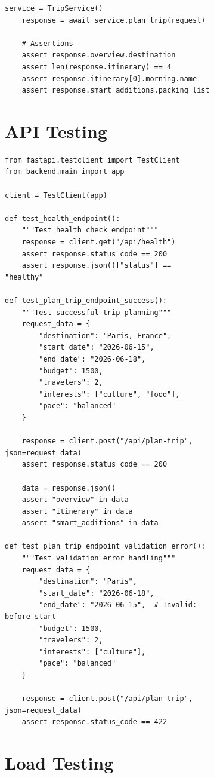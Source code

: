 \documentclass[12pt,a4paper]{report}
\begin{document}
\begin{figure}[H]
\begin{plantuml}
\begin{figure}[H]
\begin{plantuml}
\begin{lstlisting}[style=pythonstyle, caption={Integration Test Examples}]
    service = TripService()
    response = await service.plan_trip(request)
    
    # Assertions
    assert response.overview.destination
    assert len(response.itinerary) == 4
    assert response.itinerary[0].morning.name
    assert response.smart_additions.packing_list
\end{lstlisting}

\section{API Testing}

\begin{lstlisting}[style=pythonstyle, caption={API Endpoint Tests}]
from fastapi.testclient import TestClient
from backend.main import app

client = TestClient(app)

def test_health_endpoint():
    """Test health check endpoint"""
    response = client.get("/api/health")
    assert response.status_code == 200
    assert response.json()["status"] == "healthy"

def test_plan_trip_endpoint_success():
    """Test successful trip planning"""
    request_data = {
        "destination": "Paris, France",
        "start_date": "2026-06-15",
        "end_date": "2026-06-18",
        "budget": 1500,
        "travelers": 2,
        "interests": ["culture", "food"],
        "pace": "balanced"
    }
    
    response = client.post("/api/plan-trip", json=request_data)
    assert response.status_code == 200
    
    data = response.json()
    assert "overview" in data
    assert "itinerary" in data
    assert "smart_additions" in data

def test_plan_trip_endpoint_validation_error():
    """Test validation error handling"""
    request_data = {
        "destination": "Paris",
        "start_date": "2026-06-18",
        "end_date": "2026-06-15",  # Invalid: before start
        "budget": 1500,
        "travelers": 2,
        "interests": ["culture"],
        "pace": "balanced"
    }
    
    response = client.post("/api/plan-trip", json=request_data)
    assert response.status_code == 422
\end{lstlisting}

\section{Load Testing}


\end{plantuml}
\end{figure}
\end{plantuml}
\end{figure}
\end{document}
